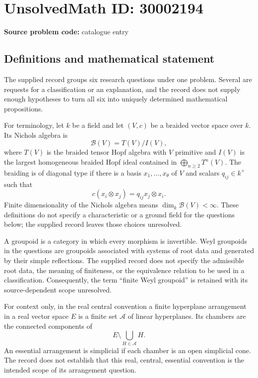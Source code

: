 \documentclass[11pt]{article}
\begin{document}
\section*{UnsolvedMath ID: 30002194}
\textbf{Source problem code:} catalogue entry
\subsection{Definitions and mathematical statement}
The supplied record groups six research questions under one problem. Several are requests for a classification or an explanation, and the record does not supply enough hypotheses to turn all six into uniquely determined mathematical propositions.

For terminology, let \(k\) be a field and let \((V,c)\) be a braided vector space over \(k\). Its Nichols algebra is
\[
\mathcal B(V)=T(V)/I(V),
\]
where \(T(V)\) is the braided tensor Hopf algebra with \(V\) primitive and \(I(V)\) is the largest homogeneous braided Hopf ideal contained in \(\bigoplus_{n\geq 2}T^n(V)\). The braiding is of diagonal type if there is a basis \(x_1,\ldots,x_\theta\) of \(V\) and scalars \(q_{ij}\in k^\times\) such that
\[
c(x_i\otimes x_j)=q_{ij}x_j\otimes x_i.
\]
Finite dimensionality of the Nichols algebra means \(\dim_k\mathcal B(V)<\infty\). These definitions do not specify a characteristic or a ground field for the questions below; the supplied record leaves those choices unresolved.

A groupoid is a category in which every morphism is invertible. Weyl groupoids in the questions are groupoids associated with systems of root data and generated by their simple reflections. The supplied record does not specify the admissible root data, the meaning of finiteness, or the equivalence relation to be used in a classification. Consequently, the term ``finite Weyl groupoid'' is retained with its source-dependent scope unresolved.

For context only, in the real central convention a finite hyperplane arrangement in a real vector space \(E\) is a finite set \(\mathcal A\) of linear hyperplanes. Its chambers are the connected components of
\[
E\setminus\bigcup_{H\in\mathcal A}H.
\]
An essential arrangement is simplicial if each chamber is an open simplicial cone. The record does not establish that this real, central, essential convention is the intended scope of its arrangement question.
\end{document}
